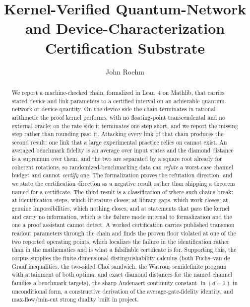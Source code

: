 \documentclass[aps,pra,reprint,nofootinbib,superscriptaddress]{revtex4-2}
\theoremstyle{plain}
\theoremstyle{definition}
\theoremstyle{remark}
\begin{document}
\title{Kernel-Verified Quantum-Network and Device-Characterization
Certification Substrate}

\author{John Roehm}

\begin{abstract}
We report a machine-checked chain, formalized in Lean~4 on Mathlib, that
carries stated device and link parameters to a certified interval on an
achievable quantum-network or device quantity. On the device side the
chain terminates in rational arithmetic the proof kernel performs, with
no floating-point transcendental and no external oracle; on the rate side
it terminates one step short, and we report the missing step rather than
rounding past it. Attacking every link of that chain
produces the second result: one link that a large experimental practice
relies on cannot exist. An averaged benchmark fidelity is an average over
input states and the diamond distance is a supremum over them, and the
two are separated by a square root already for coherent rotations, so
randomized-benchmarking data can \emph{refute} a worst-case channel
budget and cannot \emph{certify} one. The formalization proves the
refutation direction, and we state the certification direction as a
negative result rather than shipping a theorem named for a certificate.
The third result is a classification of where such chains break: at
identification steps, which literature closes; at library gaps, which
work closes; at genuine impossibilities, which nothing closes; and at
statements that pass the kernel and carry no information, which is the
failure mode internal to formalization and the one a proof assistant
cannot detect. A worked certification carries published transmon readout
parameters through the chain and finds the proven floor violated at one
of the two reported operating points, which localizes the failure in the
identification rather than in the mathematics and is what a falsifiable
certificate is for. Supporting this, the corpus supplies the
finite-dimensional distinguishability calculus (both Fuchs--van de Graaf
inequalities, the two-sided Choi sandwich, the Watrous semidefinite
program with attainment of both optima, and exact diamond distances for
the named channel families a benchmark targets), the sharp Audenaert
continuity constant $\ln(d-1)$ in unconditional form, a constructive
derivation of the average-gate-fidelity identity, and max-flow/min-cut
strong duality built in project.
\end{abstract}

\maketitle
\end{document}
